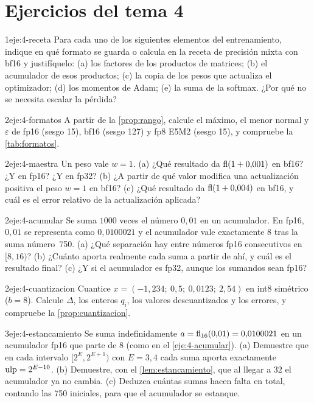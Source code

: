 \section*{Ejercicios del tema 4}

\begin{ejercicio}{1}{eje:4-receta}
Para cada uno de los siguientes elementos del entrenamiento, indique en qué formato se guarda o calcula en la receta de precisión mixta con bf16 y justifíquelo: (a) los factores de los productos de matrices; (b) el acumulador de esos productos; (c) la copia de los pesos que actualiza el optimizador; (d) los momentos de Adam; (e) la suma de la softmax. ¿Por qué no se necesita escalar la pérdida?
\end{ejercicio}

\begin{ejercicio}{2}{eje:4-formatos}
A partir de la \cref{prop:rango}, calcule el máximo, el menor normal y $\varepsilon$ de fp16 (sesgo 15), bf16 (sesgo 127) y fp8 E5M2 (sesgo 15), y compruebe la \cref{tab:formatos}.
\end{ejercicio}

\begin{ejercicio}{2}{eje:4-maestra}
Un peso vale $w=1$. (a) ¿Qué resultado da $\operatorname{fl}(1+0{,}001)$ en bf16? ¿Y en fp16? ¿Y en fp32? (b) ¿A partir de qué valor modifica una actualización positiva el peso $w=1$ en bf16? (c) ¿Qué resultado da $\operatorname{fl}(1+0{,}004)$ en bf16, y cuál es el error relativo de la actualización aplicada?
\end{ejercicio}

\begin{ejercicio}{2}{eje:4-acumular}
Se suma $1000$ veces el número $0{,}01$ en un acumulador. En fp16, $0{,}01$ se representa como $0{,}0100021$ y el acumulador vale exactamente $8$ tras la suma número~750. (a) ¿Qué separación hay entre números fp16 consecutivos en $[8,16)$? (b) ¿Cuánto aporta realmente cada suma a partir de ahí, y cuál es el resultado final? (c) ¿Y si el acumulador es fp32, aunque los sumandos sean fp16?
\end{ejercicio}

\begin{ejercicio}{2}{eje:4-cuantizacion}
Cuantice $x=(-1{,}234;\ 0{,}5;\ 0{,}0123;\ 2{,}54)$ en int8 simétrico ($b=8$). Calcule $\Delta$, los enteros $q_i$, los valores descuantizados y los errores, y compruebe la \cref{prop:cuantizacion}.
\end{ejercicio}

\begin{ejercicio}{3}{eje:4-estancamiento}
Se suma indefinidamente $a=\operatorname{fl}_{16}(0{,}01)=0{,}0100021$ en un acumulador fp16 que parte de $8$ (como en el \cref{eje:4-acumular}). (a) Demuestre que en cada intervalo $[2^{E},2^{E+1})$ con $E=3,4$ cada suma aporta exactamente $\operatorname{ulp}=2^{E-10}$. (b) Demuestre, con el \cref{lem:estancamiento}, que al llegar a $32$ el acumulador ya no cambia. (c) Deduzca cuántas sumas hacen falta en total, contando las 750 iniciales, para que el acumulador se estanque.
\end{ejercicio}
